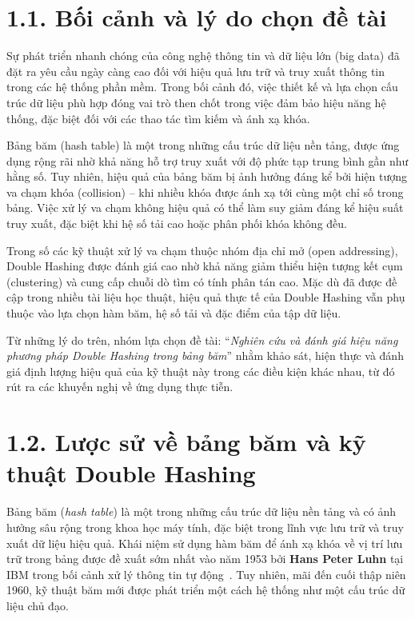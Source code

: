 \documentclass[12pt,a4paper]{report}
\begin{document}
\section*{1.1. Bối cảnh và lý do chọn đề tài}
\noindent \indent Sự phát triển nhanh chóng của công nghệ thông tin và dữ liệu lớn (big data) đã đặt ra yêu cầu ngày càng cao đối với hiệu quả lưu trữ và truy xuất thông tin trong các hệ thống phần mềm. Trong bối cảnh đó, việc thiết kế và lựa chọn cấu trúc dữ liệu phù hợp đóng vai trò then chốt trong việc đảm bảo hiệu năng hệ thống, đặc biệt đối với các thao tác tìm kiếm và ánh xạ khóa.

Bảng băm (hash table) là một trong những cấu trúc dữ liệu nền tảng, được ứng dụng rộng rãi nhờ khả năng hỗ trợ truy xuất với độ phức tạp trung bình gần như hằng số. Tuy nhiên, hiệu quả của bảng băm bị ảnh hưởng đáng kể bởi hiện tượng va chạm khóa (collision) – khi nhiều khóa được ánh xạ tới cùng một chỉ số trong bảng. Việc xử lý va chạm không hiệu quả có thể làm suy giảm đáng kể hiệu suất truy xuất, đặc biệt khi hệ số tải cao hoặc phân phối khóa không đều.

Trong số các kỹ thuật xử lý va chạm thuộc nhóm địa chỉ mở (open addressing), Double Hashing được đánh giá cao nhờ khả năng giảm thiểu hiện tượng kết cụm (clustering) và cung cấp chuỗi dò tìm có tính phân tán cao. Mặc dù đã được đề cập trong nhiều tài liệu học thuật, hiệu quả thực tế của Double Hashing vẫn phụ thuộc vào lựa chọn hàm băm, hệ số tải và đặc điểm của tập dữ liệu.

Từ những lý do trên, nhóm lựa chọn đề tài:
“\textit{Nghiên cứu và đánh giá hiệu năng phương pháp Double Hashing trong bảng băm}”
nhằm khảo sát, hiện thực và đánh giá định lượng hiệu quả của kỹ thuật này trong các điều kiện khác nhau, từ đó rút ra các khuyến nghị về ứng dụng thực tiễn.

\section*{1.2. Lược sử về bảng băm và kỹ thuật Double Hashing}
\noindent \indent Bảng băm (\textit{hash table}) là một trong những cấu trúc dữ liệu nền tảng và có ảnh hưởng sâu rộng trong khoa học máy tính, đặc biệt trong lĩnh vực lưu trữ và truy xuất dữ liệu hiệu quả. Khái niệm sử dụng hàm băm để ánh xạ khóa về vị trí lưu trữ trong bảng được đề xuất sớm nhất vào năm 1953 bởi \textbf{Hans Peter Luhn} tại IBM trong bối cảnh xử lý thông tin tự động~\cite{luhn1953}. Tuy nhiên, mãi đến cuối thập niên 1960, kỹ thuật băm mới được phát triển một cách hệ thống như một cấu trúc dữ liệu chủ đạo.
\end{document}
